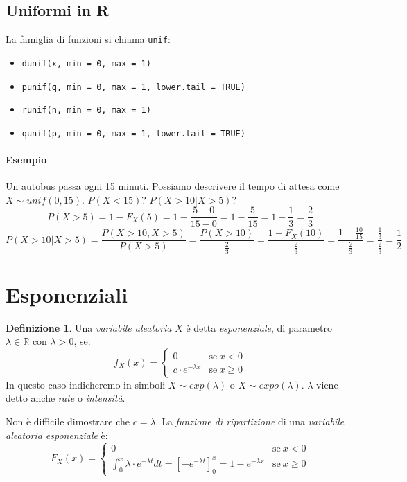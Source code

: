 \documentclass[12pt, a4paper]{report}
\theoremstyle{definition}
\newtheorem{definition}{Definizione}[section]
\DeclareRobustCommand{\R}{\mathbb{R}}%
\begin{document}
\subsection{Uniformi in R}
La famiglia di funzioni si chiama \texttt{unif}:
\begin{itemize}
	\item \texttt{dunif(x, min = 0, max = 1)}
	\item \texttt{punif(q, min = 0, max = 1, lower.tail = TRUE)}
	\item \texttt{runif(n, min = 0, max = 1)}
	\item \texttt{qunif(p, min = 0, max = 1, lower.tail = TRUE)}
\end{itemize}

\paragraph*{Esempio}
Un autobus passa ogni 15 minuti. Possiamo descrivere il tempo di attesa come
$X\sim unif(0,15)$. \(P(X<15)\)? \(P(X>10|X>5)\)?
\[P(X>5)=1-F_X(5)=1-\frac{5-0}{15-0}=1-\frac{5}{15}=1-\frac{1}{3}=\frac{2}{3}\]
\[P(X>10|X>5)=\frac{P(X>10, X>5)}{P(X>5)}=\frac{P(X>10)}{\frac{2}{3}}=\frac{1-
F_X(10)}{\frac{2}{3}}=\frac{1-\frac{10}{15}}{\frac{2}{3}}=\frac{\frac{1}{3}}
{\frac{2}{3}}=\frac{1}{2}\]

\section{Esponenziali}
\begin{definition}
	Una \emph{variabile aleatoria} $X$ è detta \emph{esponenziale}, di parametro
	\(\lambda\in\R\) con \(\lambda>0\), se:
	\[f_X(x)=\begin{cases}
		{0} & \text{se}\ {x<0}\\
		{c\cdot e^{-\lambda x}} & \text{se}\ {x\geq 0}
	\end{cases}\]
	In questo caso indicheremo in simboli \(X\sim exp(\lambda)\) o
	\(X\sim expo(\lambda)\). $\lambda$ viene detto anche \emph{rate} o \emph{intensità}.
\end{definition}

Non è difficile dimostrare che \(c=\lambda\). La \emph{funzione di ripartizione}
di una \emph{variabile aleatoria esponenziale} è:
\[F_X(x)=\begin{cases}
	{0} & \text{se}\ {x<0}\\
	{\int_0^x\lambda\cdot e^{-\lambda t}dt=\left[-e^{-\lambda t}\right]_0^x=1-e^{-\lambda x}} &
	\text{se}\ {x\geq 0}
\end{cases}\]
\end{document}
